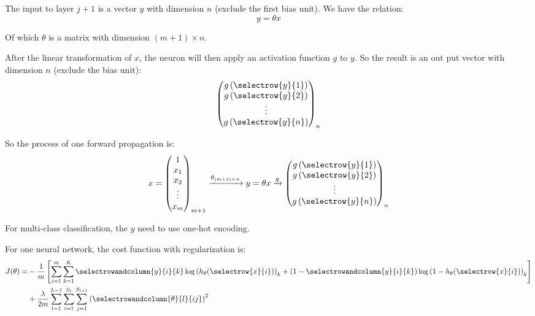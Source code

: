 The input to layer $j+1$ is a vector $y$ with dimension $n$ (exclude the first bias unit). We have the relation:
\begin{equation}
    y = \theta x
\end{equation}

Of which $\theta$ is a matrix with dimension ${(m+1) \times n}$.

After the linear transformation of $x$, the neuron will then apply an activation function $g$ to $y$. So the result is an out put vector with dimension $n$ (exclude the bias unit):
\begin{equation}
    \begin{pmatrix}
        g\left(\selectrow{y}{1}\right) \\
        g\left(\selectrow{y}{2}\right) \\
        \vdots \\
        g\left(\selectrow{y}{n}\right)
    \end{pmatrix}_n
\end{equation}

So the process of one forward propagation is:
\begin{equation}
    x = \begin{pmatrix}
        1 \\
        x_1 \\
        x_2 \\
        \vdots \\
        x_m
    \end{pmatrix}_{m+1} \xrightarrow{\theta_{(m+1) \times n}} y = \theta x \xrightarrow{g} \begin{pmatrix}
        g\left(\selectrow{y}{1}\right) \\
        g\left(\selectrow{y}{2}\right) \\
        \vdots \\
        g\left(\selectrow{y}{n}\right)
    \end{pmatrix}_n
\end{equation}


For multi-class classification, the $y$ need to use one-hot encoding.


For one neural network, the cost function with regularization is:
\begin{equation}
    \begin{aligned}
        J(\theta) =& -\frac{1}{m} \left[\sum_{i=1}^m \sum_{k=1}^K \selectrowandcolumn{y}{i}{k} \log \left( h_\theta (\selectrow{x}{i}) \right)_k + (1-\selectrowandcolumn{y}{i}{k}) \log \left( 1- h_\theta (\selectrow{x}{i}) \right)_k \right] \\
        &+ \frac{\lambda}{2m} \sum_{l=1}^{L-1} \sum_{i=1}^{S_l} \sum_{j=1}^{S_{l+1}} \left( \selectrowandcolumn{\theta}{l}{ij} \right)^2
    \end{aligned}
\end{equation}


